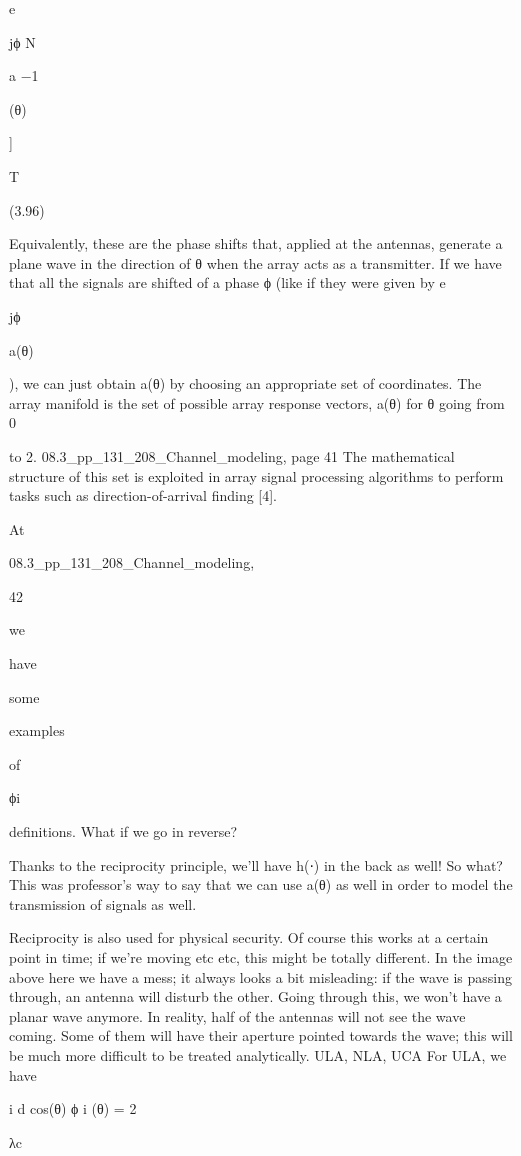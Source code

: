 {{{{e

jϕ N

a −1

(θ)

]

T

(3.96)

Equivalently, these are the phase shifts that, applied at the antennas, generate a plane wave in the direction of θ when the array acts as a transmitter.
If we have that all the signals are shifted of a phase ϕ (like if they were given by e

jϕ

a(θ)

), we can just obtain a(θ) by choosing an appropriate set of coordinates.
The array manifold is the set of possible array response vectors, {a(θ)} for θ going from 0

to 2\pi.
08.3_pp_131_208_Channel_modeling, page 41 The mathematical structure of this set is exploited in array signal processing algorithms to perform tasks such as direction-of-arrival finding [4].

At

08.3_pp_131_208_Channel_modeling,

42

we

have

some

examples

of

ϕi

definitions.
What if we go in reverse?

Thanks to the reciprocity principle, we'll have h(⋅) in the back as well!
​So what?
This was professor's way to say that we can use a(θ) as well in order to model the transmission of signals as well.

Reciprocity is also used for physical security. Of course this works at a certain point in time; if we're moving etc etc, this might be totally different.
In the image above here we have a mess; it always looks a bit misleading: if the wave is passing through, an antenna will disturb the other. Going through this, we won't have a planar wave anymore. In reality, half of the antennas will not see the wave coming.
Some of them will have their aperture pointed towards the wave; this will be much more difficult to be treated analytically.
ULA, NLA, UCA For ULA, we have

i d cos(θ)
ϕ i (θ) = 2\pi

λc

}}}}
